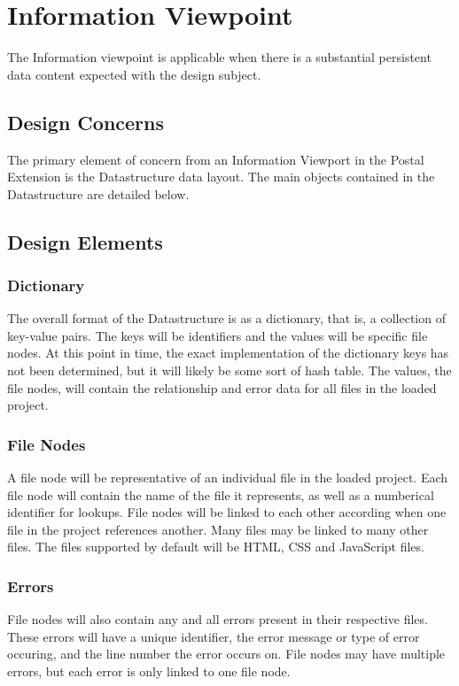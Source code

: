 \documentclass[letterpaper,10pt,titlepage,draftclsnofoot,onecolumn,onesided] {IEEEtran}
\begin{document}
	
\section{Information Viewpoint}
The Information viewpoint is applicable when there is a substantial persistent data content expected with
the design subject. 
\subsection{Design Concerns}
The primary element of concern from an Information Viewport in the Postal Extension is the Datastructure data layout. 
The main objects contained in the Datastructure are detailed below.
\subsection{Design Elements}

	\subsubsection{Dictionary}
	The overall format of the Datastructure is as a dictionary, that is, a collection of key-value pairs. 
	The keys will be identifiers and the values will be specific file nodes. 
	At this point in time, the exact implementation of the dictionary keys has not been determined, but it will likely be some sort of hash table.
	The values, the file nodes, will contain the relationship and error data for all files in the loaded project.
	\subsubsection{File Nodes}
		A file node will be representative of an individual file in the loaded project. 
		Each file node will contain the name of the file it represents, as well as a numberical identifier for lookups.
		File nodes will be linked to each other according when one file in the project references another. 
		Many files may be linked to many other files.
		The files supported by default will be HTML, CSS and JavaScript files.
		
	\subsubsection{Errors}
		File nodes will also contain any and all errors present in their respective files.
		These errors will have a unique identifier, the error message or type of error occuring, and the line number the error occurs on.
		File nodes may have multiple errors, but each error is only linked to one file node.
\end{document}
